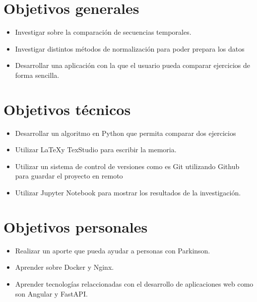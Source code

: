 
\section{Objetivos generales}
\begin{itemize}
	\item Investigar sobre la comparación de secuencias temporales.
	\item  Investigar distintos métodos de normalización para poder prepara los datos
	\item Desarrollar una aplicación con la que el usuario pueda comparar ejercicios de forma sencilla.
\end{itemize}
\section{Objetivos técnicos}
\begin{itemize}
	\item Desarrollar un algoritmo en Python que permita comparar dos ejercicios
	\item Utilizar \LaTeX y TexStudio para escribir la memoria.
	\item Utilizar un sistema de control de versiones como es Git utilizando Github para guardar el proyecto en remoto
	\item Utilizar Jupyter Notebook para mostrar los resultados de la investigación.
	
\end{itemize}
\section{Objetivos personales}
\begin{itemize}
	\item Realizar un aporte que pueda ayudar a personas con Parkinson.
	\item Aprender sobre Docker y Nginx.
	\item Aprender tecnologías relaccionadas con el desarrollo de aplicaciones web como son Angular y FastAPI.
	
\end{itemize}